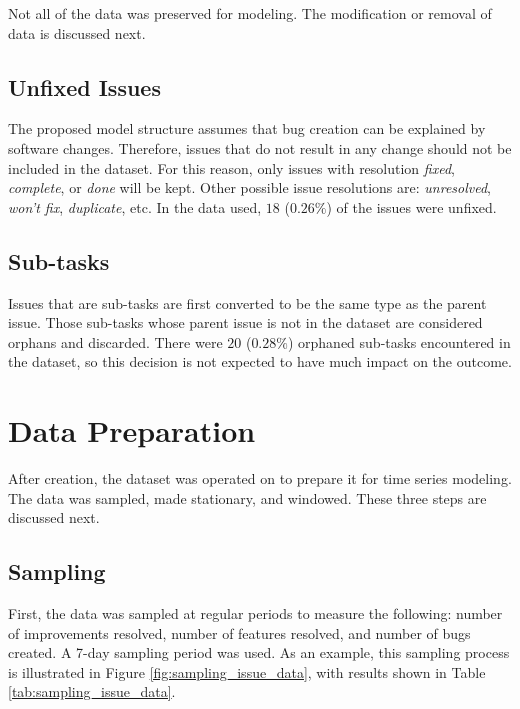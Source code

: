 \documentclass[letterpaper]{report}
\begin{document}
Not all of the data was preserved for modeling. The modification or removal of data is discussed next.

\subsection*{Unfixed Issues}
The proposed model structure assumes that bug creation can be explained by software changes. Therefore, issues that do not result in any change should not be included in the dataset. For this reason, only issues with resolution \textit{fixed}, \textit{complete}, or \textit{done} will be kept. Other possible issue resolutions are: \textit{unresolved}, \textit{won't fix}, \textit{duplicate}, etc. In the data used, $18$ ($0.26\%$) of the issues were unfixed. 

\subsection*{Sub-tasks}
Issues that are sub-tasks are first converted to be the same type as the parent issue. Those sub-tasks whose parent issue is not in the dataset are considered orphans and discarded. There were $20$ ($0.28\%$) orphaned sub-tasks encountered in the dataset, so this decision is not expected to have much impact on the outcome.

\section*{Data Preparation}
After creation, the dataset was operated on to prepare it for time series modeling. The data was sampled, made stationary, and windowed. These three steps are discussed next.

\subsection*{Sampling}

First, the data was sampled at regular periods to measure the following: number of improvements resolved, number of features resolved, and number of bugs created. A 7-day sampling period was used. As an example, this sampling process is illustrated in Figure \ref{fig:sampling_issue_data}, with results shown in Table \ref{tab:sampling_issue_data}.
\end{document}
